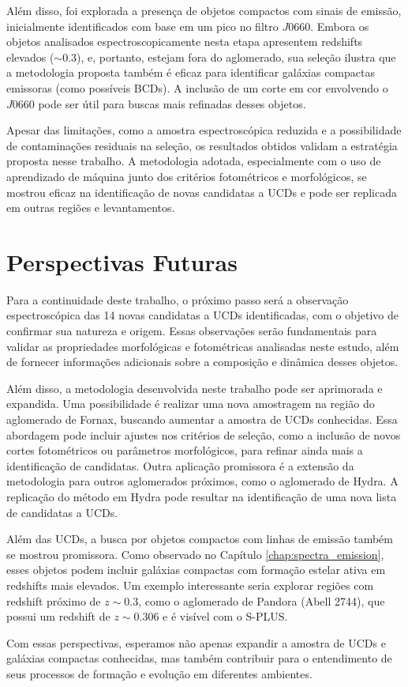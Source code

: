 Além disso, foi explorada a presença de objetos compactos com sinais de emissão, inicialmente identificados com base em um pico no filtro $J0660$. Embora os objetos analisados espectroscopicamente nesta etapa apresentem redshifts elevados ($\sim 0.3$), e, portanto, estejam fora do aglomerado, sua seleção ilustra que a metodologia proposta também é eficaz para identificar galáxias compactas emissoras (como possíveis BCDs). A inclusão de um corte em cor envolvendo o $J0660$ pode ser útil para buscas mais refinadas desses objetos.

Apesar das limitações, como a amostra espectroscópica reduzida e a possibilidade de contaminações residuais na seleção, os resultados obtidos validam a estratégia proposta nesse trabalho. A metodologia adotada, especialmente com o uso de aprendizado de máquina junto dos critérios fotométricos e morfológicos, se mostrou eficaz na identificação de novas candidatas a UCDs e pode ser replicada em outras regiões e levantamentos.

\section{Perspectivas Futuras}\label{sec:perspectivas_futuras}

Para a continuidade deste trabalho, o próximo passo será a observação espectroscópica das 14 novas candidatas a UCDs identificadas, com o objetivo de confirmar sua natureza e origem. Essas observações serão fundamentais para validar as propriedades morfológicas e fotométricas analisadas neste estudo, além de fornecer informações adicionais sobre a composição e dinâmica desses objetos.

Além disso, a metodologia desenvolvida neste trabalho pode ser aprimorada e expandida. Uma possibilidade é realizar uma nova amostragem na região do aglomerado de Fornax, buscando aumentar a amostra de UCDs conhecidas. Essa abordagem pode incluir ajustes nos critérios de seleção, como a inclusão de novos cortes fotométricos ou parâmetros morfológicos, para refinar ainda mais a identificação de candidatas. Outra aplicação promissora é a extensão da metodologia para outros aglomerados próximos, como o aglomerado de Hydra. A replicação do método em Hydra pode resultar na identificação de uma nova lista de candidatas a UCDs.

Além das UCDs, a busca por objetos compactos com linhas de emissão também se mostrou promissora. Como observado no Capítulo \ref{chap:spectra_emission}, esses objetos podem incluir galáxias compactas com formação estelar ativa em redshifts mais elevados. Um exemplo interessante seria explorar regiões com redshift próximo de $z \sim 0.3$, como o aglomerado de Pandora (Abell 2744), que possui um redshift de $z \sim 0.306$ e é visível com o S-PLUS. 

Com essas perspectivas, esperamos não apenas expandir a amostra de UCDs e galáxias compactas conhecidas, mas também contribuir para o entendimento de seus processos de formação e evolução em diferentes ambientes.